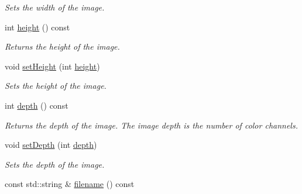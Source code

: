 \begin{DoxyCompactItemize}
\begin{DoxyCompactList}\small\item\em Sets the width of the image. \end{DoxyCompactList}\item 
\hypertarget{class_f_f_l_d_1_1_scene_a3111f1cc57c61e7ddef8d323cc7a39e1}{int \hyperlink{class_f_f_l_d_1_1_scene_a3111f1cc57c61e7ddef8d323cc7a39e1}{height} () const }\label{class_f_f_l_d_1_1_scene_a3111f1cc57c61e7ddef8d323cc7a39e1}

\begin{DoxyCompactList}\small\item\em Returns the height of the image. \end{DoxyCompactList}\item 
\hypertarget{class_f_f_l_d_1_1_scene_ac3795ed21e14b60c8da5cc56be878bfe}{void \hyperlink{class_f_f_l_d_1_1_scene_ac3795ed21e14b60c8da5cc56be878bfe}{set\-Height} (int \hyperlink{class_f_f_l_d_1_1_scene_a3111f1cc57c61e7ddef8d323cc7a39e1}{height})}\label{class_f_f_l_d_1_1_scene_ac3795ed21e14b60c8da5cc56be878bfe}

\begin{DoxyCompactList}\small\item\em Sets the height of the image. \end{DoxyCompactList}\item 
\hypertarget{class_f_f_l_d_1_1_scene_ae4a337a10ad66d6a3aefd17f56db25f0}{int \hyperlink{class_f_f_l_d_1_1_scene_ae4a337a10ad66d6a3aefd17f56db25f0}{depth} () const }\label{class_f_f_l_d_1_1_scene_ae4a337a10ad66d6a3aefd17f56db25f0}

\begin{DoxyCompactList}\small\item\em Returns the depth of the image. The image depth is the number of color channels. \end{DoxyCompactList}\item 
\hypertarget{class_f_f_l_d_1_1_scene_a591b19e8f70a8fdc3591d1045c7d4686}{void \hyperlink{class_f_f_l_d_1_1_scene_a591b19e8f70a8fdc3591d1045c7d4686}{set\-Depth} (int \hyperlink{class_f_f_l_d_1_1_scene_ae4a337a10ad66d6a3aefd17f56db25f0}{depth})}\label{class_f_f_l_d_1_1_scene_a591b19e8f70a8fdc3591d1045c7d4686}

\begin{DoxyCompactList}\small\item\em Sets the depth of the image. \end{DoxyCompactList}\item 
\hypertarget{class_f_f_l_d_1_1_scene_ababad2108f7abba4268b22c27e083bfc}{const std\-::string \& \hyperlink{class_f_f_l_d_1_1_scene_ababad2108f7abba4268b22c27e083bfc}{filename} () const }\label{class_f_f_l_d_1_1_scene_ababad2108f7abba4268b22c27e083bfc}


\end{DoxyCompactItemize}
